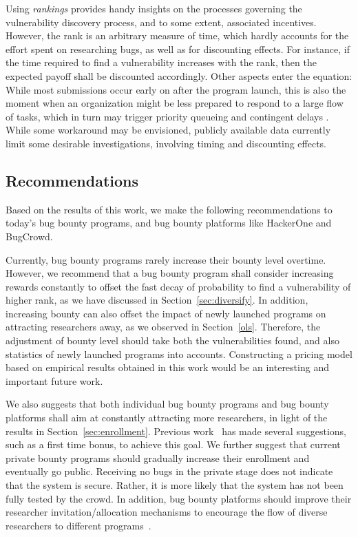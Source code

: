 Using {\it rankings} provides handy insights on the processes governing the vulnerability discovery process, and to some extent, associated incentives. However, the rank is an arbitrary measure of time, which hardly accounts for the effort spent on researching bugs, as well as for discounting effects. For instance, if the time required to find a vulnerability increases with the rank, then the expected payoff shall be discounted accordingly. Other aspects enter the equation: While most submissions occur early on after the program launch, this is also the moment when an organization might be less prepared to respond to a large flow of tasks, which in turn may trigger priority queueing and contingent delays \cite{maillart2011quantification}. While some workaround may be envisioned, publicly available data currently limit some desirable investigations, involving timing and discounting effects.\\

\subsection{Recommendations}

Based on the results of this work, we make the following recommendations to today's bug bounty programs, and bug bounty platforms like HackerOne and BugCrowd.

Currently, bug bounty programs rarely increase their bounty level overtime. However, we recommend that a bug bounty program shall consider increasing rewards constantly to offset the fast decay of probability to find a vulnerability of higher rank, as we have discussed in Section~\ref{sec:diversify}. In addition, increasing bounty can also offset the impact of newly launched programs on attracting researchers away, as we observed in Section~\ref{ols}. Therefore, the adjustment of bounty level should take both the vulnerabilities found, and also statistics of newly launched programs into accounts. Constructing a pricing model based on empirical results obtained in this work would be an interesting and important future work.

We also suggests that both individual bug bounty programs and bug bounty platforms shall aim at constantly attracting more researchers, in light of the results in Section~\ref{sec:enrollment}. Previous work~\cite{zhao2015empirical} has made several suggestions, such as a first time bonus, to achieve this goal. We further suggest that current private bounty programs should gradually increase their enrollment and eventually go public. Receiving no bugs in the private stage does not indicate that the system is secure. Rather, it is more likely that the system has not been fully tested by the crowd. In addition, bug bounty platforms should improve their researcher invitation/allocation mechanisms to encourage the flow of diverse researchers to different programs~\cite{zhao2016crowdsourced}.

